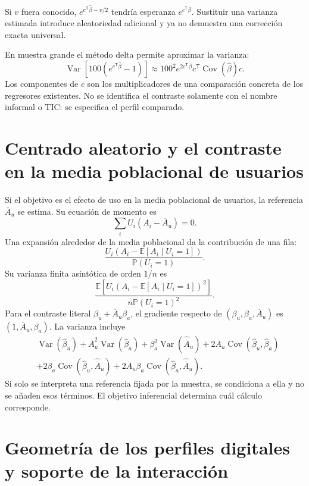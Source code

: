\documentclass[11pt,a4paper]{article}
\newcommand{\E}{\mathbb E}
\newcommand{\Prob}{\mathbb P}
\DeclareMathOperator{\Var}{Var}
\DeclareMathOperator{\Cov}{Cov}
\begin{document}
Si $v$ fuera conocido, $e^{c^{\mathsf T}\widehat\beta-v/2}$ tendría esperanza $e^{c^{\mathsf T}\beta}$. Sustituir una varianza estimada introduce aleatoriedad adicional y ya no demuestra una corrección exacta universal.

En muestra grande el método delta permite aproximar la varianza:
\[
\Var[100(e^{c^{\mathsf T}\widehat\beta}-1)]
\approx100^2e^{2c^{\mathsf T}\beta}c^{\mathsf T}\Cov(\widehat\beta)c.
\]
Los componentes de $c$ son los multiplicadores de una comparación concreta de los regresores existentes. No se identifica el contraste solamente con el nombre informal o TIC: se especifica el perfil comparado.

\clearpage
\section{Centrado aleatorio y el contraste en la media poblacional de usuarios}

Si el objetivo es el efecto de uso en la media poblacional de usuarios, la referencia $\overline A_u$ se estima. Su ecuación de momento es
\[
\sum_iU_i(A_i-\overline A_u)=0.
\]
Una expansión alrededor de la media poblacional da la contribución de una fila:
\[
\frac{U_i(A_i-\E[A_i\mid U_i=1])}{\Prob(U_i=1)}.
\]
Su varianza finita asintótica de orden $1/n$ es
\[
\frac{\E[U_i(A_i-\E[A_i\mid U_i=1])^2]}
{n\Prob(U_i=1)^2}.
\]
Para el contraste literal $\beta_u+\overline A_u\beta_a$, el gradiente respecto de $(\beta_u,\beta_a,\overline A_u)$ es
$(1,\overline A_u,\beta_a)$. La varianza incluye
\[
\begin{aligned}
&\Var(\widehat\beta_u)+\overline A_u^2\Var(\widehat\beta_a)
+\beta_a^2\Var(\widehat{\overline A}_u)
+2\overline A_u\Cov(\widehat\beta_u,\widehat\beta_a)\\
&+2\beta_a\Cov(\widehat\beta_u,\widehat{\overline A}_u)
+2\overline A_u\beta_a\Cov(\widehat\beta_a,\widehat{\overline A}_u).
\end{aligned}
\]
Si solo se interpreta una referencia fijada por la muestra, se condiciona a ella y no se añaden esos términos. El objetivo inferencial determina cuál cálculo corresponde.

\clearpage
\section{Geometría de los perfiles digitales y soporte de la interacción}
\end{document}
